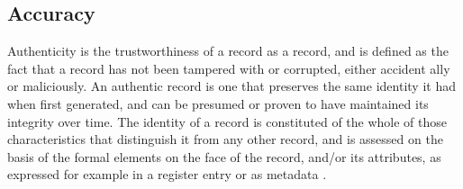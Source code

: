 \subsection{Accuracy}
Authenticity is the trustworthiness of a record as a record, and is defined as the fact that a record has not been tampered with or corrupted, either accident ally or maliciously. An authentic record is one that preserves the same identity it had when first generated, and can be presumed or proven to have maintained its integrity over time. The identity of a record is constituted of the whole of those characteristics that distinguish it from any other record, and is assessed on the basis of the formal elements on the face of the record, and/or its attributes, as expressed for example in a register entry or as metadata \cite[52]{duranti2009digital}.

